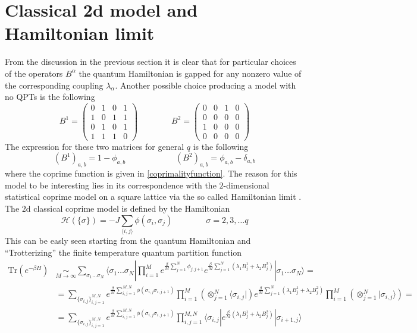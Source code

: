 \documentclass[aps,pra,superscriptaddress]{revtex4}
\newcommand\be            {\begin{equation}}
\newcommand\ee            {\end{equation}}
\renewcommand{\(}{\left(}
\renewcommand{\)}{\right)}
\renewcommand{\[}{\left[}
\renewcommand{\]}{\right]}
\newcommand\ket[1]{|#1\rangle}
\newcommand\bra[1]{\langle #1 |}
\newcommand\braket[3]{\langle #1 | #2 | #3 \rangle }
\begin{document}
\section{Classical 2d model and Hamiltonian limit}
From the discussion in the previous section it is clear that for particular choices of the operators $B^\alpha$ the quantum Hamiltonian is gapped for any nonzero value of the corresponding coupling $\lambda_\alpha$. Another possible choice producing a model with no QPTs is the following
\be 
B^1 = 
\begin{pmatrix}
0 & 1 & 0 & 1 \\
1 & 0 & 1 & 1 \\
0 & 1 & 0 & 1 \\
1 & 1 & 1 & 0 
\end{pmatrix}
\qquad
\qquad
B^2 = 
\begin{pmatrix}
0 & 0 & 1 & 0 \\
0 & 0 & 0 & 0 \\
1 & 0 & 0 & 0 \\
0 & 0 & 0 & 0 
\end{pmatrix}
\ee
The expression for these two matrices for general $q$ is the following
\be \label{hamlimbs}
(B^1)_{a,b}  = 1 - \phi_{a,b}
\qquad \qquad \qquad
(B^2)_{a,b} = \phi_{a,b} - \delta_{a,b} 
\ee
where the coprime function is given in \eqref{coprimalityfunction}. The reason for this model to be interesting lies in its correspondence with the $2$-dimensional statistical coprime model on a square lattice via the so called Hamiltonian limit \cite{kogut}. The $2$d classical coprime model is defined by the Hamiltonian
\be \label{classham}
\mathcal{ H } ( \{ \sigma \} ) = -J \sum_{ \langle i , j \rangle } \phi ( \sigma_i , \sigma_j )
\qquad \qquad
\sigma = 2,3,\dots q 
\ee
This can be easly seen starting from the quantum Hamiltonian and ``Trotterizing'' the finite temperature quantum partition function
\begin{align}
\mathrm{Tr} \( e^{-\beta H } \) & \underset{ M \to \infty}{ \sim }  \sum_{ \sigma_1 \dots \sigma_N } \braket{ \sigma_1 \dots \sigma_N }{ \prod_{i=1}^M e^{ \frac{\beta}{M} \sum_{j=1}^N \phi_{j,j+1} } e^{  \frac{\beta}{M} \sum_{j=1}^N ( \lambda_1 B^1_j + \lambda_2 B^2_j ) } }{  \sigma_1 \dots \sigma_N } =  \\[1mm]
 &  =  \sum_{ \{ \sigma_{i,j} \}_{i,j=1}^{M,N} } e^{ \frac{\beta}{M} \sum_{i,j=1}^{M,N} \phi (\sigma_{i,j}\sigma_{i,j+1}) }  \prod_{i=1}^M \( \otimes_{j=1}^{N}  \bra{  \sigma_{i,j} } \) { e^{  \frac{\beta}{M} \sum_{j=1}^N ( \lambda_1 B^1_j + \lambda_2 B^2_j ) } } \prod_{i=1}^M  \( \otimes_{j=1}^{N}  \ket{  \sigma_{i,j} } \) = \\[1mm]
  & = \sum_{ \{ \sigma_{i,j} \}_{i,j=1}^{M,N} } e^{ \frac{\beta}{M} \sum_{i,j=1}^{M,N} \phi (\sigma_{i,j}\sigma_{i,j+1}) }  \prod_{i,j=1}^{M,N} \braket{ \sigma_{i,j}  }{ e^{  \frac{\beta}{M} ( \lambda_1 B^1_j + \lambda_2 B^2_j ) } }{ \sigma_{{i+1},j}  } \label{quant}
\end{align}
\end{document}
